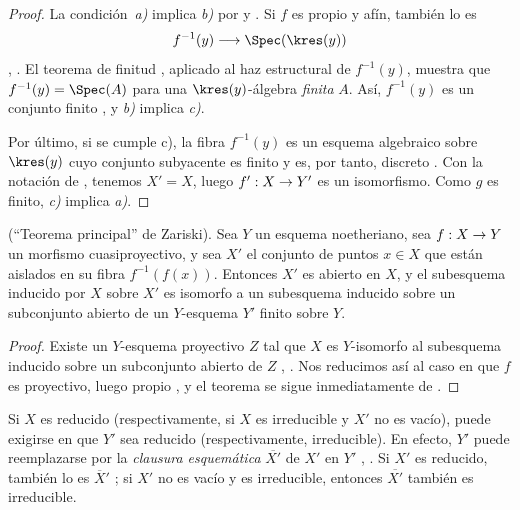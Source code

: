 \documentclass[oneside]{amsart}
\makeatletter
\newcommand{\ega@arrow}[2]{\mathchoice{#1}{#2}{#2}{#2}}
\renewcommand{\to}{\ega@arrow{\longrightarrow}{\rightarrow}}
\let\EGAOriginalLabel\label
\renewcommand{\label}[1]{\phantomsection\EGAOriginalLabel{#1}}
\makeatother
\begin{document}
\begin{proof}
La condición~\emph{a)} implica \emph{b)} por  y
. Si $f$ es propio y afín, también lo es
\[
  f^{-1}(y)\longrightarrow\Spec(\kres(y))
\]
, . El teorema de finitud
, aplicado al haz estructural de $f^{-1}(y)$, muestra
que $f^{-1}(y)=\Spec(A)$ para una $\kres(y)$-álgebra \emph{finita} $A$. Así,
$f^{-1}(y)$ es un conjunto finito , y \emph{b)} implica
\emph{c)}.

Por último, si se cumple c), la fibra $f^{-1}(y)$ es un esquema
algebraico sobre $\kres(y)$ cuyo conjunto subyacente es finito y es,
por tanto, discreto . Con la notación de
, tenemos $X'=X$, luego
$f':X\to Y'$ es un isomorfismo. Como $g$ es finito, \emph{c)} implica \emph{a)}.
\end{proof}

\begin{theorem}[4.4.3]
\label{III.4.4.3}
\textnormal{(``Teorema principal'' de Zariski).}
Sea $Y$ un esquema noetheriano, sea $f:X\to Y$ un morfismo
cuasiproyectivo, y sea $X'$ el conjunto de puntos $x\in X$ que están
aislados en su fibra $f^{-1}(f(x))$. Entonces $X'$ es abierto en $X$,
y el subesquema inducido por $X$ sobre $X'$ es isomorfo a un
subesquema inducido sobre un subconjunto abierto de un $Y$-esquema
$Y'$ finito sobre $Y$.
\end{theorem}

\begin{proof}
Existe un $Y$-esquema proyectivo $Z$ tal que $X$ es
$Y$-isomorfo al subesquema inducido sobre un subconjunto abierto de
$Z$ , . Nos reducimos así al
caso en que $f$ es proyectivo, luego propio , y el
teorema se sigue inmediatamente de
.
\end{proof}

\begin{remark}[4.4.4]
\label{III.4.4.4}
Si $X$ es reducido (respectivamente, si $X$ es irreducible y $X'$ no
es vacío), puede exigirse en  que $Y'$ sea reducido
(respectivamente, irreducible). En efecto, $Y'$ puede reemplazarse por
la \emph{clausura esquemática} $\overline{X'}$ de $X'$ en $Y'$
, . Si $X'$ es reducido, también
lo es $\overline{X}'$ ; si $X'$ no es vacío y es
irreducible, entonces $\overline{X'}$ también es irreducible.
\end{remark}
\end{document}
